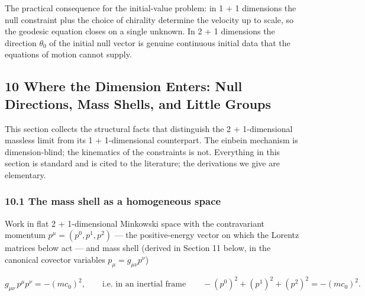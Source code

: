 \documentclass[
]{article}
\begin{document}
The practical consequence for the initial-value problem: in 1 + 1
dimensions the null constraint plus the choice of chirality determine
the velocity up to scale, so the geodesic equation closes on a single
unknown. In 2 + 1 dimensions the direction \(\theta_{0}\) of the initial
null vector is genuine continuous initial data that the equations of
motion cannot supply.

\hypertarget{where-the-dimension-enters-null-directions-mass-shells-and-little-groups}{%
\subsection{10 Where the Dimension Enters: Null Directions, Mass Shells,
and Little
Groups}\label{where-the-dimension-enters-null-directions-mass-shells-and-little-groups}}

This section collects the structural facts that distinguish the 2 +
1-dimensional massless limit from its 1 + 1-dimensional counterpart. The
einbein mechanism is dimension-blind; the kinematics of the constraints
is not. Everything in this section is standard and is cited to the
literature; the derivations we give are elementary.

\hypertarget{the-mass-shell-as-a-homogeneous-space}{%
\subsubsection{10.1 The mass shell as a homogeneous
space}\label{the-mass-shell-as-a-homogeneous-space}}

Work in flat 2 + 1-dimensional Minkowski space with the contravariant
momentum \(p^{\mu} = (p^{0}, p^{1}, p^{2})\) --- the positive-energy
vector on which the Lorentz matrices below act --- and mass shell
(derived in Section 11 below, in the canonical covector variables
\(p_{\mu} = g_{\mu\nu} p^{\nu}\))

\[g_{\mu\nu}\, p^{\mu} p^{\nu} = - (mc_{0})^{2}, \qquad \text{i.e. in an inertial frame} \qquad - (p^{0})^{2} + (p^{1})^{2} + (p^{2})^{2} = - (mc_{0})^{2}. \tag{69}\]
\end{document}
